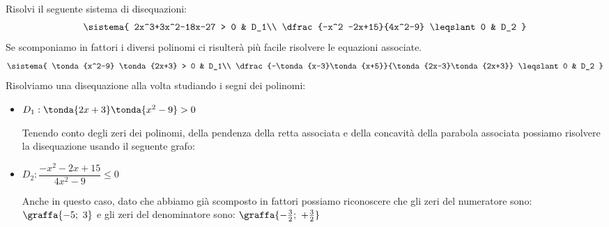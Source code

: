 \begin{esempio}{}{}
 
Risolvi il seguente sistema di disequazioni:
\[\sistema{
    2x^3+3x^2-18x-27 > 0 & D_1\\
    \dfrac{-x^2 -2x+15}{4x^2-9} \leqslant 0 & D_2
  }
\]
Se scomponiamo in fattori i diversi polinomi ci risulterà più facile 
risolvere le equazioni associate.
\[\sistema{
    \tonda{x^2-9} \tonda{2x+3} > 0 & D_1\\
    \dfrac{-\tonda{x-3}\tonda{x+5}}{\tonda{2x-3}\tonda{2x+3}} \leqslant 0 & 
D_2
  }
\]
Risolviamo una disequazione alla volta studiando i segni dei polinomi:

\begin{itemize}
 \item \(D_1: \tonda{2x+3} \tonda{x^2-9}>0\)

\begin{minipage}{.44\textwidth}
Tenendo conto degli zeri dei polinomi, della pendenza della retta associata 
e della concavità della parabola associata possiamo risolvere la disequazione 
usando il seguente grafo:
\end{minipage}
\hfill
\begin{minipage}{.54\textwidth}
\begin{center} \segnosistemaaa \end{center}
\end{minipage}

 \item \(D_2: \dfrac{-x^2 -2x+15}{4x^2-9} \leqslant 0\)

Anche in questo caso, dato che abbiamo già scomposto in fattori possiamo 
riconoscere che gli zeri del numeratore sono:
\(\graffa{-5;~3}\) 
e gli zeri del denominatore sono:
\(\graffa{-\frac{3}{2};~+\frac{3}{2}}\) 

\end{itemize}


\end{esempio}
